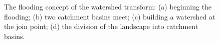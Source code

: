 \documentclass[preprint,a4paper]{elsarticle}
\newenvironment{stusubfig}[1]
{
	\begin{figure}[#1]
	\begin{center}
}
{
	\end{center}
	\end{figure}
}
\begin{document}
\begin{stusubfig}{p}
	\hspace{4mm}%
	\hspace{4mm}%
	\hspace{4mm}%
\caption{The flooding concept of the watershed transform: (a) beginning the flooding; (b) two catchment basins meet; (c) building a watershed at the join point; (d) the division of the landscape into catchment basins.}
\label{fig:segmentation-watershed-floodingconcept}
\end{stusubfig}
\end{document}
